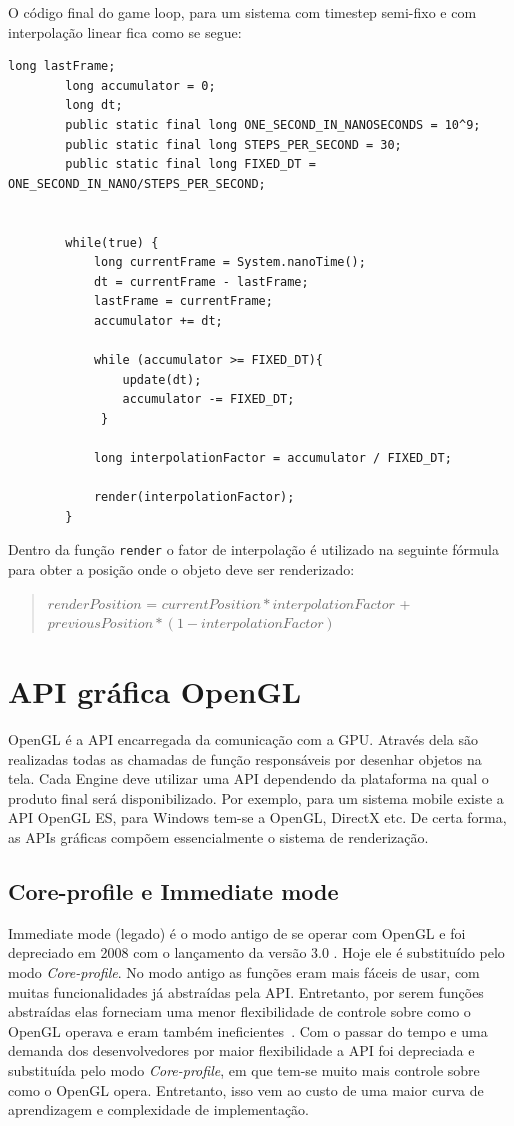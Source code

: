 \documentclass[12pt, 
openright, 
oneside, 
a4paper,    
brazil]{facom-ufu-abntex2}
\begin{document}
\noindent
O código final do game loop, para um sistema com timestep semi-fixo e com interpolação linear fica como se segue:
\begin{lstlisting}[caption=Game Loop com timestep semi-fixo e interpolação linear]
		long lastFrame;
		long accumulator = 0;
		long dt;
		public static final long ONE_SECOND_IN_NANOSECONDS = 10^9;
		public static final long STEPS_PER_SECOND = 30;
		public static final long FIXED_DT = ONE_SECOND_IN_NANO/STEPS_PER_SECOND;
		
		
		while(true) {
			long currentFrame = System.nanoTime(); 
			dt = currentFrame - lastFrame;
			lastFrame = currentFrame;
			accumulator += dt;
	
			while (accumulator >= FIXED_DT){
    			update(dt);
    			accumulator -= FIXED_DT;
 			 }
 			 
			long interpolationFactor = accumulator / FIXED_DT; 			 
 			 
			render(interpolationFactor);
		}
\end{lstlisting}
Dentro da função \texttt{render} o fator de interpolação é utilizado na seguinte fórmula para obter a posição onde o objeto deve ser renderizado:

\begin{quote}
$renderPosition$ = $currentPosition * interpolationFactor$ + $previousPosition * (1 - interpolationFactor)$
\end{quote}

\section{API gráfica OpenGL}
OpenGL é a API encarregada da comunicação com a GPU. Através dela são realizadas todas as chamadas de função responsáveis por desenhar objetos na tela. Cada Engine deve utilizar uma API dependendo da plataforma na qual o produto final será disponibilizado. Por exemplo, para um sistema mobile existe a API OpenGL ES, para Windows tem-se a OpenGL, DirectX etc. De certa forma, as APIs gráficas compõem essencialmente o sistema de renderização.  

\subsection{Core-profile e Immediate mode}
Immediate mode (legado) é o modo antigo de se operar com OpenGL e foi depreciado em 2008 com o lançamento da versão 3.0 \cite{OpenGLHistory}. Hoje ele é substituído pelo modo \textit{Core-profile}. No modo antigo as funções eram mais fáceis de usar, com muitas funcionalidades já abstraídas pela API. Entretanto, por serem funções abstraídas elas forneciam uma menor flexibilidade de controle sobre como o OpenGL  operava e eram também ineficientes~\cite{LearnOpenGL}. Com o passar do tempo e uma demanda dos desenvolvedores por maior flexibilidade a API foi depreciada e substituída pelo modo \textit{Core-profile}, em que tem-se muito mais controle sobre como o OpenGL opera. Entretanto, isso vem ao custo de uma maior curva de aprendizagem e complexidade de implementação.
\end{document}
